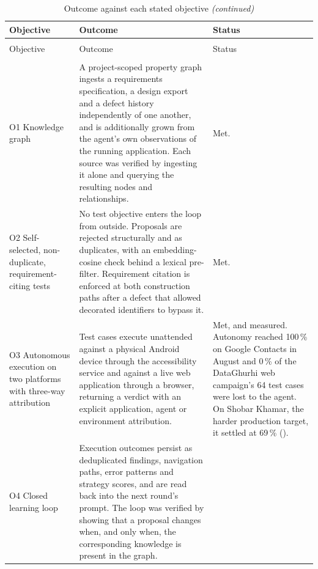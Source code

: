 \begingroup
\small
\setlength{\tabcolsep}{5pt}
\begin{xltabular}{\textwidth}{@{}>{\hsize}Y>{\hsize}Y>{\hsize}Y@{}}
  \caption{Outcome against each stated objective}
  \label{tab:objectives}\\
  \toprule
  Objective & Outcome & Status \\
  \midrule
  \endfirsthead
  \caption[]{Outcome against each stated objective \emph{(continued)}}\\
  \toprule
  Objective & Outcome & Status \\
  \midrule
  \endhead
  \midrule
  \\
  \endfoot
  \bottomrule
  \endlastfoot

  O1 Knowledge graph &
    A project-scoped property graph ingests a requirements specification, a design export and a defect history independently of one another, and is additionally grown from the agent's own observations of the running application. Each source was verified by ingesting it alone and querying the resulting nodes and relationships. &
    Met. \\
  \addlinespace
  O2 Self-selected, non-duplicate, requirement-citing tests &
    No test objective enters the loop from outside. Proposals are rejected structurally and as duplicates, with an embedding-cosine check behind a lexical pre-filter. Requirement citation is enforced at both construction paths after a defect that allowed decorated identifiers to bypass it. &
    Met. \\
  \addlinespace
  O3 Autonomous execution on two platforms with three-way attribution &
    Test cases execute unattended against a physical Android device through the accessibility service and against a live web application through a browser, returning a verdict with an explicit application, agent or environment attribution. &
    Met, and measured. Autonomy reached 100\,\% on Google Contacts in August and 0\,\% of the DataGhurhi web campaign's 64 test cases were lost to the agent. On Shobar Khamar, the harder production target, it settled at 69\,\% (). \\
  \addlinespace
  O4 Closed learning loop &
    Execution outcomes persist as deduplicated findings, navigation paths, error patterns and strategy scores, and are read back into the next round's prompt. The loop was verified by showing that a proposal changes when, and only when, the corresponding knowledge is present in the graph. &

\end{xltabular}

